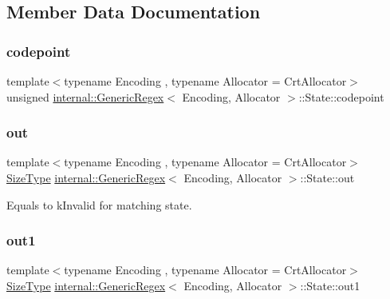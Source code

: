 \subsection{Member Data Documentation}
\mbox{\label{structinternal_1_1GenericRegex_1_1State_ab085a481f7a18c4a70d4cc534a72a23e}} 
\subsubsection{\texorpdfstring{codepoint}{codepoint}}
{\footnotesize\ttfamily template$<$typename Encoding , typename Allocator  = Crt\+Allocator$>$ \\
unsigned \hyperlink{classinternal_1_1GenericRegex}{internal\+::\+Generic\+Regex}$<$ Encoding, Allocator $>$\+::State\+::codepoint}

\mbox{\label{structinternal_1_1GenericRegex_1_1State_a2db0ecd5296137b4e27a8bdb9b9b3a36}} 
\subsubsection{\texorpdfstring{out}{out}}
{\footnotesize\ttfamily template$<$typename Encoding , typename Allocator  = Crt\+Allocator$>$ \\
\hyperlink{rapidjson_8h_a5ed6e6e67250fadbd041127e6386dcb5}{Size\+Type} \hyperlink{classinternal_1_1GenericRegex}{internal\+::\+Generic\+Regex}$<$ Encoding, Allocator $>$\+::State\+::out}



Equals to k\+Invalid for matching state. 

\mbox{\label{structinternal_1_1GenericRegex_1_1State_a018baa62233a52e87df7dac21dcfefc7}} 
\subsubsection{\texorpdfstring{out1}{out1}}
{\footnotesize\ttfamily template$<$typename Encoding , typename Allocator  = Crt\+Allocator$>$ \\
\hyperlink{rapidjson_8h_a5ed6e6e67250fadbd041127e6386dcb5}{Size\+Type} \hyperlink{classinternal_1_1GenericRegex}{internal\+::\+Generic\+Regex}$<$ Encoding, Allocator $>$\+::State\+::out1}



